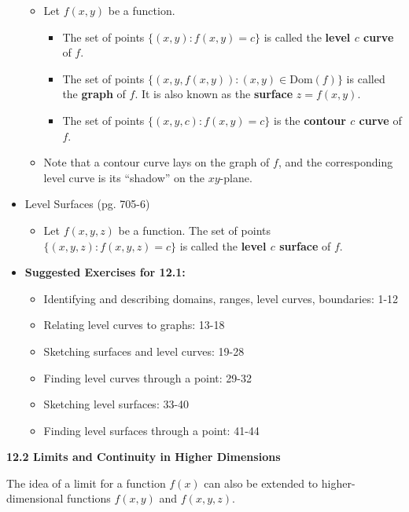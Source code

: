 \documentclass[12pt]{article}
\theoremstyle{plain}
\theoremstyle{definition}
\theoremstyle{remark}
\begin{document}
\begin{itemize}
		\begin{itemize}
		\item Let $f(x,y)$ be a function.
			\begin{itemize}
			\item The set of points $\{(x,y):f(x,y)=c\}$ is called the \textbf{level $c$ curve} of $f$.
			\item The set of points $\{(x,y,f(x,y)): (x,y)\in \textrm{Dom}(f)\}$ is called the \textbf{graph} of $f$. It is also known as the \textbf{surface} $z=f(x,y)$.
			\item The set of points $\{(x,y,c): f(x,y)=c\}$ is the \textbf{contour $c$ curve} of $f$.
			\end{itemize}
		\item Note that a contour curve lays on the graph of $f$, and the corresponding level curve is its ``shadow'' on the $xy$-plane.
		\end{itemize}
	
	\item Level Surfaces (pg. 705-6)
	
		\begin{itemize}
		\item Let $f(x,y,z)$ be a function. The set of points $\{(x,y,z):f(x,y,z)=c\}$ is called the \textbf{level $c$ surface} of $f$.
		\end{itemize}
	
	\item \textbf{ Suggested Exercises for 12.1:}
	
		\begin{itemize}
		\item Identifying and describing domains, ranges, level curves, boundaries: 1-12
		\item Relating level curves to graphs: 13-18
		\item Sketching surfaces and level curves: 19-28
		\item Finding level curves through a point: 29-32
		\item Sketching level surfaces: 33-40
		\item Finding level surfaces through a point: 41-44
		\end{itemize}
		
	\end{itemize}
	
	\newpage
	
	\centerline{\bf 12.2 Limits and Continuity in Higher Dimensions}
	
	The idea of a limit for a function $f(x)$ can also be extended to higher-dimensional functions $f(x,y)$ and $f(x,y,z)$.
	
\end{document}

